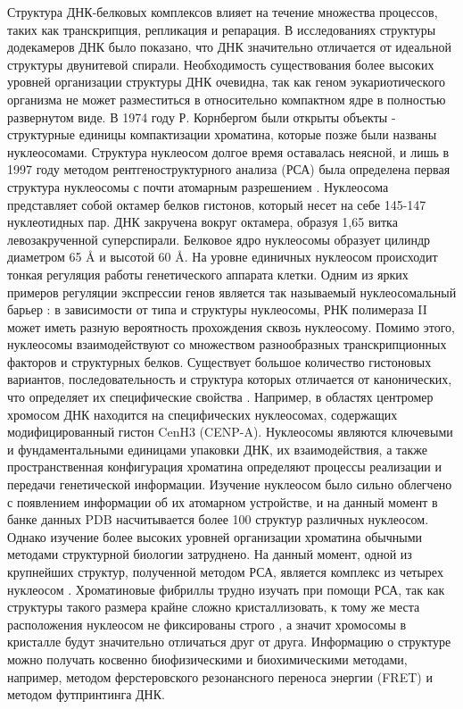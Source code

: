 Структура ДНК-белковых комплексов влияет на течение множества процессов, таких как транскрипция, репликация и репарация. В исследованиях структуры додекамеров ДНК было показано, что ДНК значительно отличается от идеальной структуры двунитевой спирали. Необходимость существования более высоких уровней организации структуры ДНК очевидна, так как геном эукариотического организма не может разместиться в относительно компактном ядре в полностью развернутом виде. 
В 1974 году Р. Корнбергом \cite{kornberg_chromatin_1974} были открыты объекты - структурные единицы компактизации хроматина, которые позже были названы нуклеосомами. Структура нуклеосом долгое время оставалась неясной, и лишь в 1997 году методом рентгеноструктурного анализа (РСА) была определена первая структура нуклеосомы с почти атомарным разрешением \cite{luger_crystal_1997}. Нуклеосома представляет собой октамер белков гистонов, который несет на себе 145-147 нуклеотидных пар. ДНК закручена вокруг октамера, образуя 1,65 витка левозакрученной суперспирали. Белковое ядро нуклеосомы образует цилиндр диаметром 65 Å и высотой 60 Å. На уровне единичных нуклеосом происходит тонкая регуляция работы генетического аппарата клетки. Одним из ярких примеров регуляции экспрессии генов является так называемый нуклеосомальный барьер \cite{studitsky_overcoming_1995}: в зависимости от типа и структуры нуклеосомы, РНК полимераза II может иметь разную вероятность прохождения сквозь нуклеосому. Помимо этого, нуклеосомы взаимодействуют со множеством разнообразных транскрипционных факторов и структурных белков. Существует большое количество гистоновых вариантов, последовательность и структура которых отличается от канонических, что определяет их специфические свойства \cite{schalch_x-ray_2005}. Например, в областях центромер хромосом ДНК находится на специфических нуклеосомах, содержащих модифицированный гистон CenH3 (CENP-A). 
Нуклеосомы являются ключевыми и фундаментальными единицами упаковки ДНК, их взаимодействия, а также пространственная конфигурация хроматина определяют процессы реализации и передачи генетической информации. Изучение нуклеосом было сильно облегчено с появлением информации об их атомарном устройстве, и на данный момент в банке данных PDB насчитывается более 100 структур различных нуклеосом. Однако изучение более высоких уровней организации хроматина обычными методами структурной биологии затруднено. На данный момент, одной из крупнейших структур, полученной методом РСА, является комплекс из четырех нуклеосом \cite{schalch_x-ray_2005}. Хроматиновые фибриллы трудно изучать при помощи РСА, так как структуры такого размера крайне сложно кристаллизовать, к тому же места расположения нуклеосом не фиксированы строго \cite{mueller-planitz_nucleosome_2013}, а значит хромосомы в кристалле будут значительно отличаться друг от друга. Информацию о структуре можно получать косвенно биофизическими и биохимическими методами, например, методом ферстеровского резонансного переноса энергии (FRET) и методом футпринтинга ДНК. 
